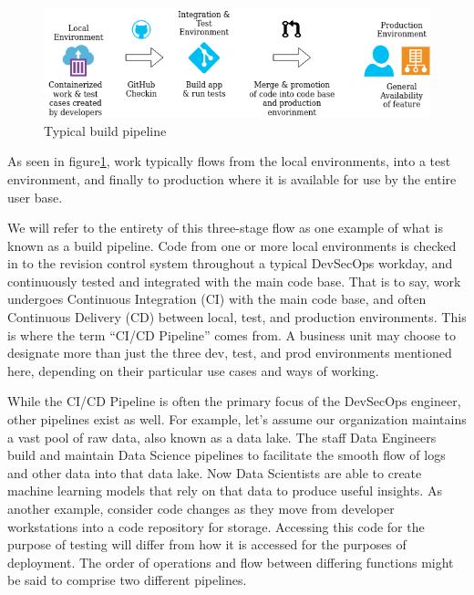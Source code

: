 \begin{figure}[!htb]
\centering
\includegraphics[scale=0.63]{../images/flow.png}
\caption{Typical build pipeline}
\label{pipeline}
\end{figure}

\justify{}
As seen in figure\ref{pipeline}, work typically flows from the
local environments, into a test environment, and finally to production
where it is available for use by the entire user base.

\justify{}
We will refer to the entirety of this three-stage flow as one example of
what is known as a build pipeline. Code from one or more local
environments is checked in to the revision control system throughout a
typical DevSecOps workday, and continuously tested and integrated with
the main code base. That is to say, work undergoes Continuous Integration
(CI) with the main code base,
and often Continuous Delivery (CD)
between local, test, and production environments. This is where the term
``CI/CD Pipeline'' comes from. A business unit may choose to designate more
than just the three dev, test, and prod environments mentioned here,
depending on their particular use cases and ways of working.

\justify{}
While the CI/CD Pipeline is often the primary focus of the DevSecOps
engineer, other pipelines exist as well. For example, let's assume our
organization maintains a vast pool of raw data, also known as a data
lake. The staff Data Engineers build and maintain
Data Science pipelines to facilitate the smooth flow
of logs and other data into that data lake. Now Data Scientists are able
to create machine learning models that rely on that data to produce useful
insights. As another example, consider code changes as they move from
developer workstations into a code repository for storage. Accessing
this code for the purpose of testing will differ from how it is accessed
for the purposes of deployment. The order of operations and flow
between differing functions might be said to comprise two different pipelines.
